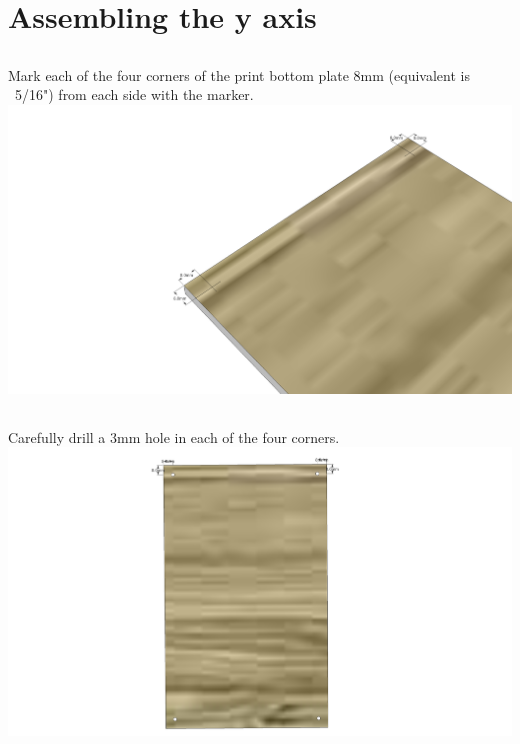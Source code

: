 \documentclass[twoside,openany,a4paper,titlepage]{memoir}
\begin{document}
	\chapter{Assembling the y axis}
	
	\section{}
	Mark each of the four corners of the print bottom plate 8mm (equivalent is ~5/16") from each side with
	the marker.\\
	\includegraphics[width=1\linewidth]{graphics/ch6_1.png}
	
	\section{}
	Carefully drill a 3mm hole in each of the four corners.\\
	\includegraphics[width=1\linewidth]{graphics/ch6_2.png}
	
\end{document}

